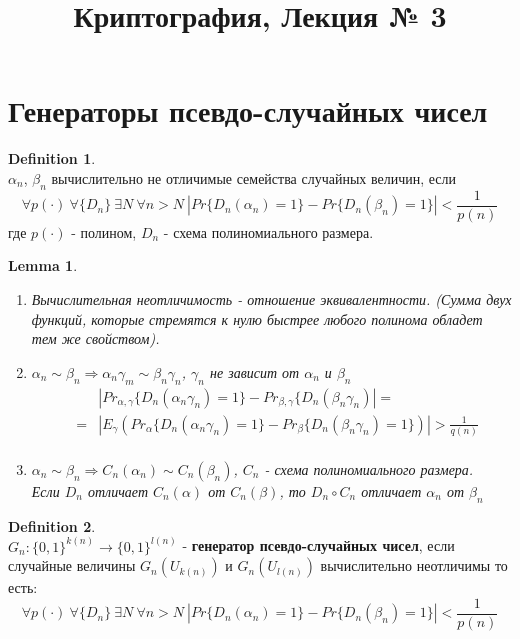 \documentclass[a4paper]{article}
\title{Криптография, Лекция № 3}
\theoremstyle{definition}
\newtheorem{definition}{Definition}
\theoremstyle{plain}
\newtheorem{lemma}{Lemma}
\begin{document}
\maketitle

\section{Генераторы псевдо-случайных чисел}

\begin{definition}~\\
	$\alpha_n$, $\beta_n$ вычислительно не отличимые семейства случайных величин, если
	$$
		\forall p(\cdot)\ \forall \{D_n\}\ \exists N\ \forall n > N\ |Pr\{D_n(\alpha_n) = 1\} - Pr\{D_n(\beta_n) = 1\}| < \frac{1}{p(n)}	
	$$
	где $p(\cdot)$ - полином, $D_n$ - схема полиномиального размера.
\end{definition}

\begin{lemma}~\\
	\begin{enumerate}
		\item Вычислительная неотличимость - отношение эквивалентности. (Сумма двух функций, которые стремятся к нулю быстрее любого полинома обладет тем же свойством).
		\item $\alpha_n \sim \beta_n \Rightarrow \alpha_n \gamma_m \sim \beta_n \gamma_n$, $\gamma_n$ не зависит от $\alpha_n$ и $\beta_n$~\\
		\begin{eqnarray*}
			&& |Pr_{\alpha, \gamma}\{D_n(\alpha_n \gamma_n) = 1\} - Pr_{\beta, \gamma}\{D_n(\beta_n \gamma_n)| =      \nonumber \\
   			& = & |E_{\gamma}(Pr_{\alpha}\{D_n(\alpha_n \gamma_n) = 1\} - Pr_{\beta}\{D_n(\beta_n \gamma_n) = 1\})| > \frac{1}{q(n)} \nonumber \\
        \end{eqnarray*}
		\item $\alpha_n \sim \beta_n \Rightarrow C_n(\alpha_n) \sim C_n(\beta_n)$, $C_n$ - схема полиномиального размера.~\\
		
		Если $D_n$ отличает $C_n(\alpha)$ от $C_n(\beta)$, то $D_n \circ C_n$ отличает $\alpha_n$ от $\beta_n$
	\end{enumerate}
\end{lemma}

\begin{definition}~\\
	$G_n \colon \{0, 1\}^{k(n)} \rightarrow \{0, 1\}^{l(n)}$ - \textbf{генератор псевдо-случайных чисел},
	если случайные величины $G_n(U_{k(n)})$ и $G_n(U_{l(n)})$ вычислительно неотличимы то есть:
	$$
		\forall p(\cdot)\ \forall \{D_n\}\ \exists N\ \forall n > N\ |Pr\{D_n(\alpha_n) = 1\} - Pr\{D_n(\beta_n) = 1\}| < \frac{1}{p(n)}	
	$$
\end{definition}
\end{document}
